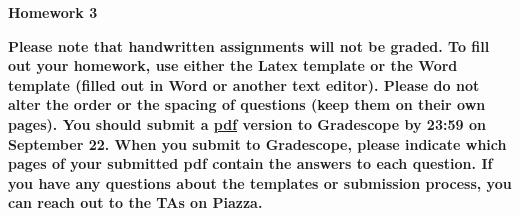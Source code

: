\documentclass[12pt]{article}
\date{}
\begin{document}
\begin{flushleft}
\large \bf
Homework 3 \\
\end{flushleft}

{\bf
	Please note that handwritten assignments will not be graded. To fill out your homework, use either the Latex template or the Word template (filled out in Word or another text editor). Please do not alter the order or the spacing of questions (keep them on their own pages).
	You should submit a \underline{pdf} version to Gradescope by 23:59 on September 22.
	When you submit to Gradescope, please indicate which pages of your submitted pdf contain the answers to each question. If you have any questions about the templates or submission process, you can reach out to the TAs on Piazza.
}
\end{document}
